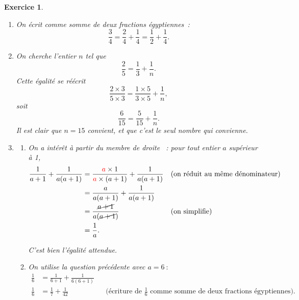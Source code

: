 \documentclass[10pt]{article}
\newtheorem{exo}{Exercice}
\begin{document}
\begin{exo}



\begin{enumerate}
\item On écrit comme somme de deux fractions égyptiennes~:
\[\frac{3}{4}=\frac{2}{4}+\frac{1}{4}=\frac{1}{2}+\frac{1}{4}.\]
\item On cherche l'entier $n$ tel que \[\frac{2}{5}=\frac{1}{3}+\frac{1}{n}.\]
Cette égalité se réécrit
\[\frac{2\times 3}{5\times 3}=\frac{1\times 5}{3\times 5}+\frac{1}{n},\]
soit \[\frac{6}{15}=\frac{5}{15}+\frac{1}{n}.\] Il est clair que $n=15$ convient, et que c'est le seul nombre qui convienne.
\item \begin{enumerate}\item On a intérêt à \og partir du membre de droite \fg~{}: pour tout entier $a$ supérieur à 1,
\begin{align*}
\frac{1}{a+1}+\frac{1}{a(a+1)}&=\frac{\textcolor{red}{a}\times 1}{\textcolor{red}{a}\times (a+1)}+\frac{1}{a(a+1)}&&\text{(on réduit au même dénominateur)}\\
&=\frac{a}{a(a+1)}+\frac{1}{a(a+1)}\\
&=\frac{\cancel{a+1}}{a(\cancel{a+1})}&&\text{(on simplifie)}\\
&=\frac{1}{a}.
\end{align*}

C'est bien l'égalité attendue.
\item On utilise la question précédente avec $a=6~:$
\begin{align*}
\frac{1}{6}&=\frac{1}{6+1}+\frac{1}{6(6+1)}\\
\frac{1}{6}&=\frac{1}{7}+\frac{1}{42}&&\text{(écriture de }\frac{1}{6}\text{ comme somme de deux fractions égyptiennes)}.
\end{align*}
\end{enumerate}
\end{enumerate}

\end{exo}
\end{document}
